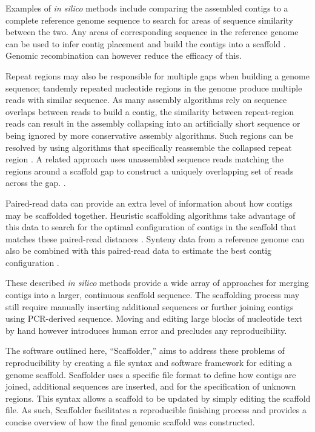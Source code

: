 \documentclass[10pt]{bmc_article}
\newenvironment{bmcformat}{\begin{raggedright}\baselineskip20pt\sloppy\setboolean{publ}{false}}{\end{raggedright}\baselineskip20pt\sloppy}
\begin{document}
\begin{bmcformat}
Examples of \emph{in silico} methods include comparing the assembled contigs
to a complete reference genome sequence to search for areas of sequence
similarity between the two. Any areas of corresponding sequence in the
reference genome can be used to infer contig placement and build the contigs
into a scaffold \cite{richter2007,zhao2008,assefa2009}. Genomic recombination
can however reduce the efficacy of this. \pb

Repeat regions may also be responsible for multiple gaps when building a
genome sequence; tandemly repeated nucleotide regions in the genome produce
multiple reads with similar sequence. As many assembly algorithms rely on
sequence overlaps between reads to build a contig, the similarity between
repeat-region reads can result in the assembly collapsing into an artificially
short sequence or being ignored by more conservative assembly algorithms. Such
regions can be resolved by using algorithms that specifically reassemble the
collapsed repeat region \cite{mulyukov2002,koren2010}. A related approach uses
unassembled sequence reads matching the regions around a scaffold gap to
construct a uniquely overlapping set of reads across the gap. \cite{tsai2010}.
\pb

Paired-read data can provide an extra level of information about how contigs
may be scaffolded together. Heuristic scaffolding algorithms take advantage of
this data to search for the optimal configuration of contigs in the scaffold
that matches these paired-read distances \cite{dayarian2010,boetzer2011}.
Synteny data from a reference genome can also be combined with this paired-read
data to estimate the best contig configuration \cite{pop2004}. \pb

These described \emph{in silico} methods provide a wide array of approaches for
merging contigs into a larger, continuous scaffold sequence. The scaffolding
process may still require manually inserting additional sequences or further
joining contigs using PCR-derived sequence. Moving and editing large blocks of
nucleotide text by hand however introduces human error and precludes any
reproducibility. \pb

The software outlined here, ``Scaffolder,'' aims to address these problems of
reproducibility by creating a file syntax and software framework for editing a
genome scaffold. Scaffolder uses a specific file format to define how contigs
are joined, additional sequences are inserted, and for the specification of
unknown regions. This syntax allows a scaffold to be updated by simply editing
the scaffold file. As such, Scaffolder facilitates a reproducible finishing
process and provides a concise overview of how the final genomic scaffold was
constructed. \pb


\end{bmcformat}
\end{document}
